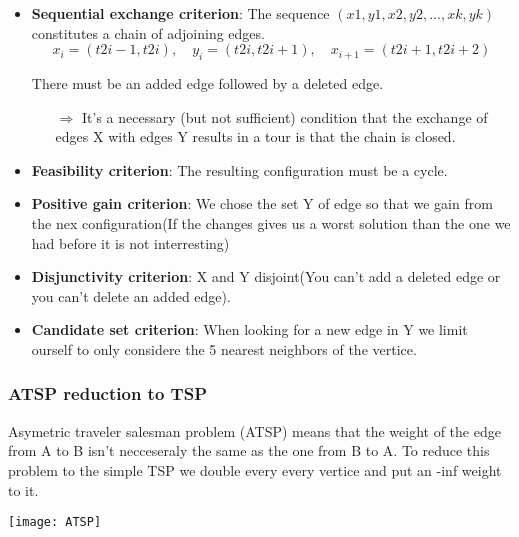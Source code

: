 \begin{itemize}
    \item \textbf{Sequential exchange criterion}: 
        The sequence $(x1, y1, x2, y2,..., xk, yk)$
        constitutes a chain of adjoining edges.
        $$x_i = (t2i -1, t2i), \quad y_i = (t2i, t2i+1), \quad x_{i+1} =
        (t2i+1, t2i+2)$$

        There must be an added edge followed by a deleted edge.

        \begin{itemize}
            \item[$\Rightarrow$] It's a necessary (but not sufficient) condition that the
        exchange of edges X with edges Y results in a tour is that the
        chain is closed.
    \end{itemize}

\item \textbf{Feasibility criterion}: 
        The resulting configuration must be a cycle.

    \item \textbf{Positive gain criterion}:
        We chose the set Y of edge so that we gain from the nex
        configuration(If the changes gives us a worst solution than the
        one we had before it is not interresting)

    \item \textbf{Disjunctivity criterion}:
        X and Y disjoint(You can't add a deleted edge or you can't
        delete an added edge).

    \item \textbf{Candidate set criterion}:
        When looking for a new edge in Y we limit ourself to only
        considere the 5 nearest neighbors of the vertice.

\end{itemize}

\subsubsection{ATSP reduction to TSP}
Asymetric traveler salesman problem (ATSP)
means that the weight of the edge from A to B isn't necceseraly the
same as the one from B to A. To reduce this problem to the simple TSP we
double every every vertice and put an -inf weight to it.

\begin{center}
    \texttt{[image: ATSP]}
\end{center}


